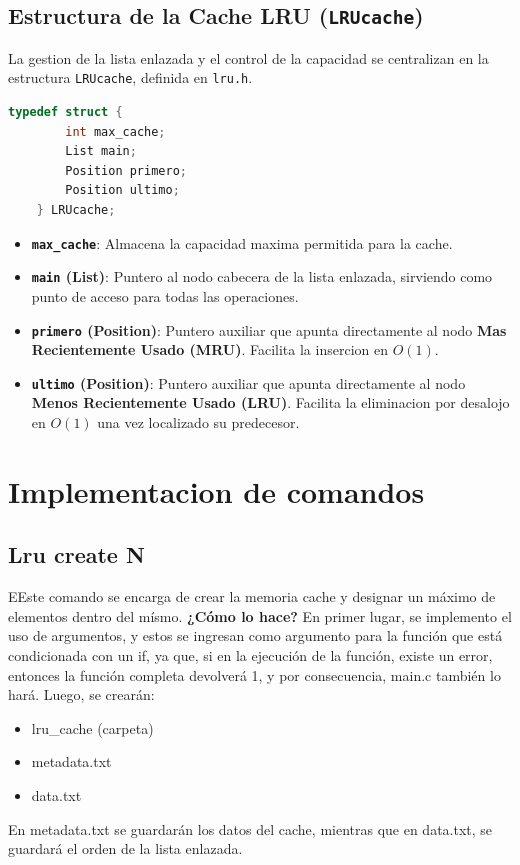     \subsection{Estructura de la Cache LRU (\texttt{LRUcache})}
    La gestion de la lista enlazada y el control de la capacidad se centralizan en la estructura \texttt{LRUcache}, definida en \texttt{lru.h}.

    \begin{lstlisting}[caption=Estructura de Control LRUcache, language=C, label=lst:LRUcache]
    typedef struct {
        int max_cache;
        List main;
        Position primero;
        Position ultimo;
    } LRUcache;
    \end{lstlisting}

    \begin{itemize}
        \item \textbf{\texttt{max\_cache}}: Almacena la capacidad maxima permitida para la cache.
        \item \textbf{\texttt{main} (List)}: Puntero al nodo cabecera de la lista enlazada, sirviendo como punto de acceso para todas las operaciones.
        \item \textbf{\texttt{primero} (Position)}: Puntero auxiliar que apunta directamente al nodo \textbf{Mas Recientemente Usado (MRU)}. Facilita la insercion en $O(1)$.
        \item \textbf{\texttt{ultimo} (Position)}: Puntero auxiliar que apunta directamente al nodo \textbf{Menos Recientemente Usado (LRU)}. Facilita la eliminacion por desalojo en $O(1)$ una vez localizado su predecesor.
    \end{itemize}
\newpage
\section{Implementacion de comandos}
    \subsection{Lru create N}
    EEste comando se encarga de crear la memoria cache y designar un máximo de elementos dentro del mísmo. 
    \textbf{¿Cómo lo hace?} En primer lugar, se implemento el uso de argumentos, y estos se ingresan como argumento 
    para la función que está condicionada con un if, ya que, si en la ejecución de la función, existe un error, 
    entonces la función completa devolverá 1, y por consecuencia, main.c también lo hará. Luego, se crearán:
    \begin{itemize}
        \item lru\_cache (carpeta)
        \item metadata.txt
        \item data.txt
    \end{itemize}
    En metadata.txt se guardarán los datos del cache, mientras que en data.txt, se guardará el orden de la lista enlazada.

